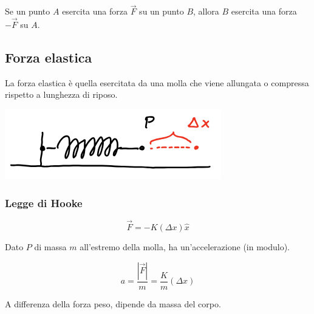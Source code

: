 \documentclass{article}
\begin{document}
Se un punto $A$ esercita una forza $\vec{F}$ su un punto $B$, allora $B$ esercita una forza $-\vec{F}$ su $A$.

\subsection{Forza elastica}

La forza elastica è quella esercitata da una molla che viene allungata o compressa rispetto a lunghezza di riposo.

\includegraphics[width=\columnwidth]{esempio-forza-elastica}

\subsubsection{Legge di Hooke}

$$
\vec{F} = -K(\Delta x) \hat{x}
$$

\noindent
Dato $P$ di massa $m$ all'estremo della molla, ha un'accelerazione (in modulo).

$$
a = \frac{|\vec{F}|}{m} = \frac{K}{m}(\Delta x)
$$

\noindent
A differenza della forza peso, dipende da massa del corpo.
\end{document}
